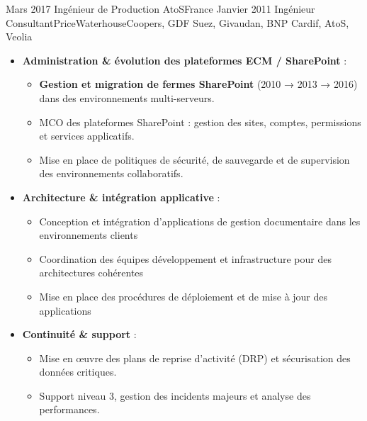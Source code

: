 \begin{experiences}
\consultantexperience
    {Mars 2017}       {Ingénieur de Production }{AtoS}{France}
    {Janvier 2011}    {Ingénieur Consultant}{PriceWaterhouseCoopers, GDF Suez, Givaudan, BNP Cardif, AtoS, Veolia} {
        \begin{itemize}[left=0pt,label={},itemsep=0.4em]
        \vspace{0.3em}  %
          \item \textbf{Administration \& évolution des plateformes ECM / SharePoint} :
            \begin{itemize}[itemsep=0.15em,topsep=0.1em,parsep=0pt]
              \small
              \item \textbf{Gestion et migration de fermes SharePoint} (2010 → 2013 → 2016) dans des environnements multi-serveurs.
              \item MCO des plateformes SharePoint : gestion des sites, comptes, permissions et services applicatifs.
              \item Mise en place de politiques de sécurité, de sauvegarde et de supervision des environnements collaboratifs.
            \end{itemize}
          \vspace{0.1em}
          \item \textbf{Architecture \& intégration applicative} :
            \begin{itemize}[itemsep=0.15em,topsep=0.1em,parsep=0pt]
              \small
              \item Conception et intégration d'applications de gestion documentaire dans les environnements clients
              \item Coordination des équipes développement et infrastructure pour des architectures cohérentes  
              \item Mise en place des procédures de déploiement et de mise à jour des applications
            \end{itemize}
          \vspace{0.1em}
          \item \textbf{Continuité \& support} :
            \begin{itemize}[itemsep=0.15em,topsep=0.1em,parsep=0pt]
              \small
              \item Mise en œuvre des plans de reprise d’activité (DRP) et sécurisation des données critiques.  
              \item Support niveau 3, gestion des incidents majeurs et analyse des performances.  

\end{itemize}
\end{itemize}}
\end{experiences}
